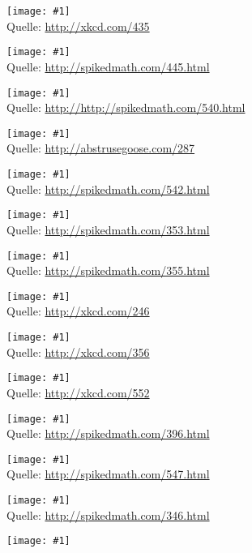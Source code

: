 \documentclass[a4paper,ngerman,landscape]{scrartcl}
\newcommand{\comic}[3]{\begin{center}
  \texttt{[image: \#1]} \\[2em]

  Quelle: \url{#2}
\end{center}\newpage}
\newcommand{\comicQ}[2]{\begin{center}
  \texttt{[image: \#1]}
\end{center}\newpage}
\begin{document}
\comic{purity.png}{http://xkcd.com/435}{0.8}
\comic{three-logicians.png}{http://spikedmath.com/445.html}{1.4}
\comic{540-adventures-of-martin.png}{http://http://spikedmath.com/540.html}{1.4}
\comic{this_is_what_my_room_looks_like_when_i_draw}{http://abstrusegoose.com/287}{0.4}
\comic{542-science-vs-math}{http://spikedmath.com/542.html}{1.4}
\comic{353-fortune-teller-1}{http://spikedmath.com/353.html}{1.4}
\comic{355-fortune-teller-3}{http://spikedmath.com/355.html}{1.4}
\comic{labyrinth_puzzle}{http://xkcd.com/246}{2.7}
\comic{nerd_sniping}{http://xkcd.com/356}{0.8}
\comic{correlation}{http://xkcd.com/552}{1.6}
\comic{homer}{http://spikedmath.com/396.html}{2.4}
\comic{547-the-perfect-score}{http://spikedmath.com/547.html}{1.3}
\comic{346-cookies}{http://spikedmath.com/346.html}{1.3}
\comicQ{boromir-gauss}{1.3}
\end{document}
